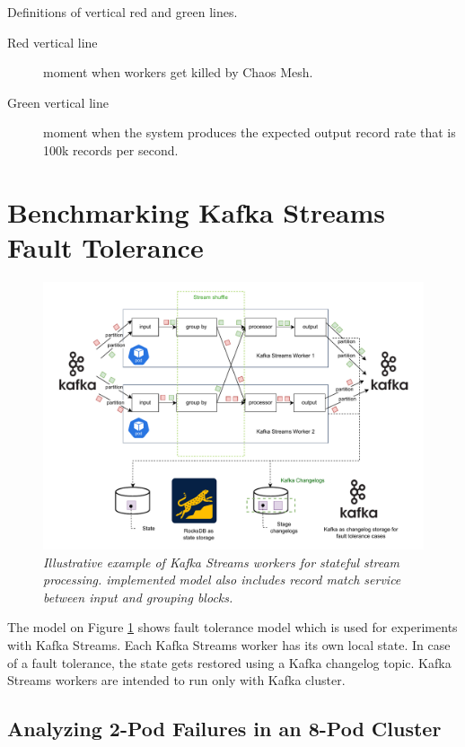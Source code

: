 Definitions of vertical red and green lines.

\begin{description}
    \item[Red vertical line] moment when workers get killed by Chaos Mesh.
    \item[Green vertical line] moment when the system produces the expected output record rate that is
    100k records per second.
\end{description}


\section{Benchmarking Kafka Streams Fault Tolerance}\label{sec:benchmarking-kafka-streams-fault-tolerance}
\begin{figure}[H]
    \centering
    \includegraphics[width=1\textwidth]{figures/kafka/kafka-streams-workers}
    \caption{\textit{Illustrative example of Kafka Streams workers for stateful stream processing.
    implemented model also includes record match service between input and grouping blocks.}}
    \label{fig:kafka-streams-workers-general}
\end{figure}

The model on Figure \ref{fig:kafka-streams-workers-general} shows fault tolerance model which is used for
experiments with Kafka Streams.
Each Kafka Streams worker has its own local state.
In case of a fault tolerance, the state gets restored using a Kafka changelog topic.
Kafka Streams workers are intended to run only with Kafka cluster.

\newpage
\subsection{Analyzing 2-Pod Failures in an 8-Pod Cluster}\label{subsec:analyzing-2-pod-failures-in-an-8-pod-cluster}

